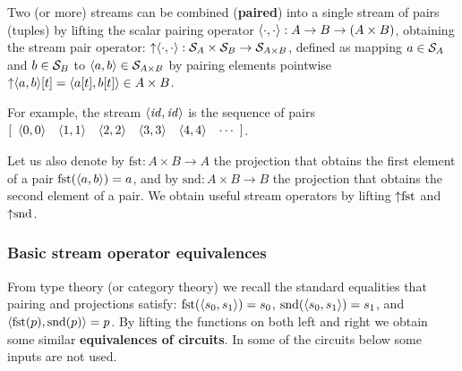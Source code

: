 Two (or more) streams can be combined (\textbf{paired})
into a single stream of pairs (tuples) by lifting the scalar pairing operator $\langle \cdot,\cdot \rangle: A \rightarrow B \rightarrow (A \times B)$,
obtaining the stream pair operator:
${\uparrow}\langle \cdot,\cdot \rangle: \mathcal{S}_{A} \times \mathcal{S}_{B} \to \mathcal{S}_{A \times B}$,
defined as mapping $a\in\mathcal{S}_{A}$ and $b\in\mathcal{S}_{B}$ to $\langle a,b \rangle\in\mathcal{S}_{A \times B}$
by pairing elements pointwise ${\uparrow}\langle a,b \rangle[t] = \langle a[t],b[t] \rangle \in A \times B$.  

For example, the stream $\langle \mathit{id},\mathit{id} \rangle$ is the sequence of pairs \\
$\sv{\pair{0}{0} \pair{1}{1} \pair{2}{2} \pair{3}{3} \pair{4}{4}}$.

Let us also denote by $\mbox{fst}: A \times B \rightarrow A$ 
the projection that obtains the first element of a pair $\mbox{fst}(\langle a,b \rangle) = a$, 
and by $\mbox{snd}: A \times B \rightarrow B$ the 
projection that obtains the second element of a pair. We obtain useful 
stream operators by lifting
${\uparrow}\mbox{fst}$ and ${\uparrow}\mbox{snd}$.

\subsubsection{Basic stream operator equivalences}
\label{sec:pairing}

From type theory (or category theory) we recall the standard equalities that pairing and projections satisfy: 
$\mbox{fst}(\langle s_0,s_1 \rangle)=s_0$, $\mbox{snd}(\langle s_0,s_1 \rangle)=s_1$, and
$\langle \mbox{fst}(p),\mbox{snd}(p) \rangle=p$.  By lifting the functions
on both left and right we obtain some similar \textbf{equivalences of circuits}.
In some of the circuits below some inputs are not used.

